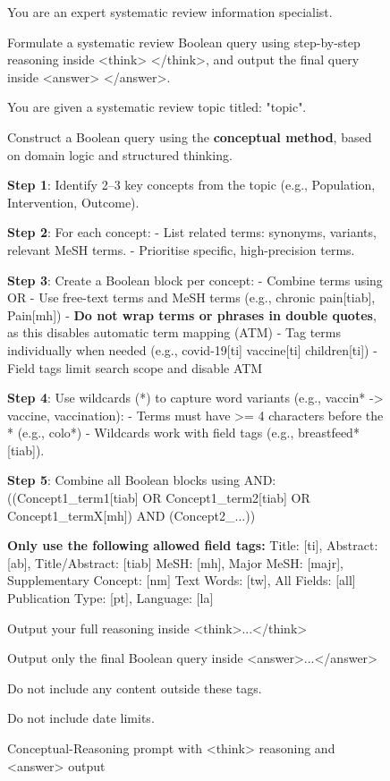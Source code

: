 \begin{figure}[ht!]
	\centering
		\small
	
	\begin{PromptBox}
		You are an expert systematic review information specialist.
		
		Formulate a systematic review Boolean query using step-by-step reasoning inside <think> </think>, and output the final query inside <answer> </answer>.
	\end{PromptBox}
	
	\vspace{1em}
	
	\begin{PromptBox}
		You are given a systematic review topic titled: "{topic}".
		
		Construct a Boolean query using the \textbf{conceptual method}, based on domain logic and structured thinking.
		
		\textbf{Step 1}: Identify 2–3 key concepts from the topic (e.g., Population, Intervention, Outcome).
		
		\textbf{Step 2}: For each concept:
		- List related terms: synonyms, variants, relevant MeSH terms.
		- Prioritise specific, high-precision terms.
		
		\textbf{Step 3}: Create a Boolean block per concept:
		- Combine terms using OR
		- Use free-text terms and MeSH terms (e.g., chronic pain[tiab], Pain[mh])
		- \textbf{Do not wrap terms or phrases in double quotes}, as this disables automatic term mapping (ATM)
		- Tag terms individually when needed (e.g., covid-19[ti] vaccine[ti] children[ti])
		- Field tags limit search scope and disable ATM
		
		\textbf{Step 4}: Use wildcards (*) to capture word variants (e.g., vaccin* -> vaccine, vaccination):
		- Terms must have >= 4 characters before the * (e.g., colo*)
		- Wildcards work with field tags (e.g., breastfeed*[tiab]).
		
		\textbf{Step 5}: Combine all Boolean blocks using AND:
		((Concept1\_term1[tiab] OR Concept1\_term2[tiab] OR Concept1\_termX[mh]) AND (Concept2\_...))
		
		\textbf{Only use the following allowed field tags:}
		Title: [ti], Abstract: [ab], Title/Abstract: [tiab]
		MeSH: [mh], Major MeSH: [majr], Supplementary Concept: [nm]
		Text Words: [tw], All Fields: [all]
		Publication Type: [pt], Language: [la]
		
		Output your full reasoning inside <think>...</think>
		
		Output only the final Boolean query inside <answer>...</answer>
		
		Do not include any content outside these tags.
		
		Do not include date limits.
	\end{PromptBox}
	
	\caption{Conceptual-Reasoning prompt with <think> reasoning and <answer> output}
	\label{fig:prompt-conceptual}
\end{figure}